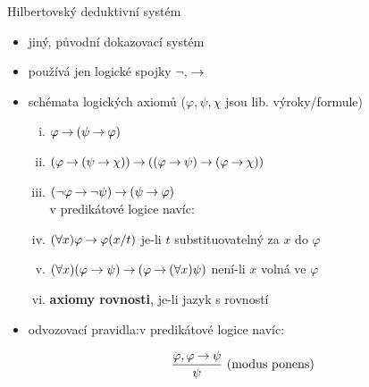 \documentclass{beamer}
\begin{document}
\begin{frame}{Hilbertovský deduktivní systém}

    \pause
    \begin{itemize}
        \item jiný, původní dokazovací systém \pause
        \item používá jen logické spojky $\neg$, $\mathbin{\rightarrow}$ \pause
        \item \alert{schémata logických axiomů} ($\varphi,\psi,\chi$ jsou lib. výroky/formule) \pause
        \begin{enumerate}[(i)]
            \item $\varphi \mathbin{\rightarrow} (\psi \mathbin{\rightarrow} \varphi)$\pause
            \item $(\varphi\mathbin{\rightarrow} (\psi \mathbin{\rightarrow} \chi))\mathbin{\rightarrow} ((\varphi \mathbin{\rightarrow} \psi)\mathbin{\rightarrow}(\varphi \mathbin{\rightarrow} \chi))$
            \item $(\neg \varphi \mathbin{\rightarrow} \neg \psi)\mathbin{\rightarrow}(\psi \mathbin{\rightarrow} \varphi)$\\ \pause
            v predikátové logice navíc: \pause
            \item $(\forall x)\varphi \mathbin{\rightarrow} \varphi(x/t)$ \hfill je-li $t$ substituovatelný za $x$ do $\varphi$ \pause
            \item $(\forall x)(\varphi \to \psi) \mathbin{\rightarrow} (\varphi \mathbin{\rightarrow} (\forall x)\psi)$ \hfill není-li $x$ volná ve $\varphi$ \pause
            \item \textbf{axiomy rovnosti}, je-li jazyk s rovností \pause
        \end{enumerate}

        \item \alert{odvozovací pravidla}:\hfill v predikátové logice navíc:
        \vspace{-6pt}
        \begin{center}
            \begin{minipage}{0.45\textwidth}
                $$
                \frac{\varphi, \varphi \mathbin{\rightarrow} \psi}{\psi}\ \text{(modus ponens)}
                $$
            \end{minipage}          
            \begin{minipage}{0.45\textwidth}
            \end{minipage}            
        \end{center}      
        
    \end{itemize}

\end{frame}
\end{document}
